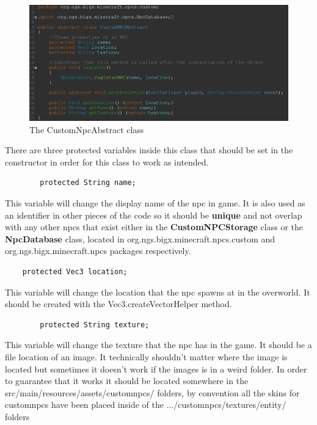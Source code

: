 \documentclass[12pt]{article}
\begin{document}
\begin{figure}[h]
	\caption{The CustomNpcAbstract class}
	\includegraphics[scale=0.5]{images/npcs/CustomNpcAbstract.png}
	\centering
\end{figure}

There are three protected variables inside this class that should be set in the constructor in order for this class to work as intended. 

\begin{verbatim}
		protected String name;
\end{verbatim}

This variable will change the display name of the npc in game. It is also used as an identifier in other pieces of the code so it should be {\bfseries unique} and not overlap with any other npcs that exist either in the {\bfseries CustomNPCStorage} class or the {\bfseries NpcDatabase} class, located in org.ngs.bigx.minecraft.npcs.custom and org.ngs.bigx.minecraft.npcs packages respectively.

\begin{verbatim}
	protected Vec3 location;	
\end{verbatim}

This variable will change the location that the npc spawns at in the overworld. It should be created with the Vec3.createVectorHelper method.

\begin{verbatim}
		protected String texture;
\end{verbatim}

This variable will change the texture that the npc has in the game. It should be a file location of an image. It technically shouldn't matter where the image is located but sometimes it doesn't work if the images is in a weird folder. In order to guarantee that it works it should be located somewhere in the src/main/resources/assets/customnpcs/ folders, by convention all the skins for customnpcs have been placed inside of the .../customnpcs/textures/entity/ folders
\end{document}
